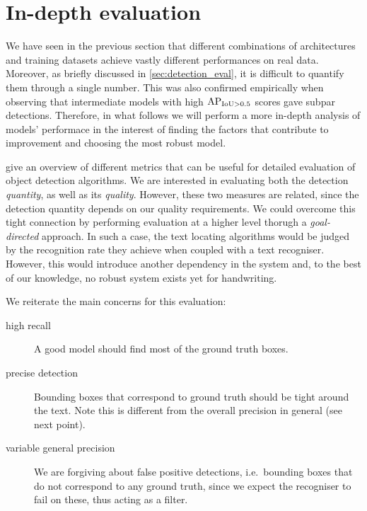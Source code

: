 

\section{In-depth evaluation}\label{sec:detection_results}

	We have seen in the previous section that different combinations of architectures and training datasets achieve vastly different performances on real data. Moreover, as briefly discussed in \autoref{sec:detection_eval}, it is difficult to quantify them through a single number. This was also confirmed empirically when observing that intermediate models with high \(\operatorname{\operatorname{AP}_{\operatorname{IoU} > 0.5}}\) scores gave subpar detections. Therefore, in what follows we will perform a more in-depth analysis of models' performace in the interest of finding the factors that contribute to improvement and choosing the most robust model.

	 give an overview of different metrics that can be useful for detailed evaluation of object detection algorithms. We are interested in evaluating both the detection \emph{quantity}, as well as its \emph{quality}. However, these two measures are related, since the detection quantity depends on our quality requirements. We could overcome this tight connection by performing evaluation at a higher level thorugh a \emph{goal-directed} approach. In such a case, the text locating algorithms would be judged by the recognition rate they achieve when coupled with a text recogniser. However, this would introduce another dependency in the system and, to the best of our knowledge, no robust system exists yet for handwriting.

	We reiterate the main concerns for this evaluation:
	\begin{description}
		\item[high recall] A good model should find most of the ground truth boxes.
		\item[precise detection] Bounding boxes that correspond to ground truth should be tight around the text. Note this is different from the overall precision in general (see next point).
		\item[variable general precision] We are forgiving about false positive detections, i.e.\ bounding boxes that do not correspond to any ground truth, since we expect the recogniser to fail on these, thus acting as a filter.
	\end{description}

